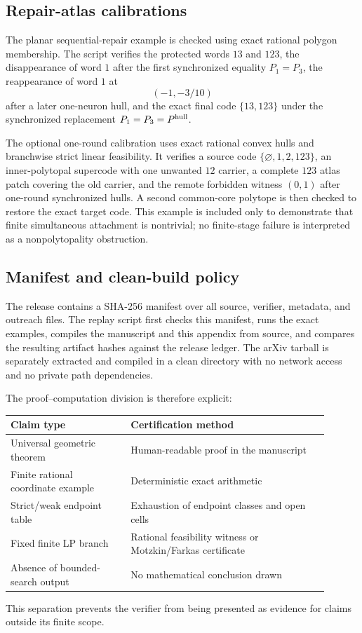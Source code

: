 \subsection{Repair-atlas calibrations}

The planar sequential-repair example is checked using exact rational polygon membership.  The script verifies the protected words $13$ and $123$, the disappearance of word $1$ after the first synchronized equality $P_1=P_3$, the reappearance of word $1$ at
\[
 (-1,-3/10)
\]
after a later one-neuron hull, and the exact final code $\{13,123\}$ under the synchronized replacement $P_1=P_3=P^{\rm hull}$.

The optional one-round calibration uses exact rational convex hulls and branchwise strict linear feasibility.  It verifies a source code $\{\varnothing,1,2,123\}$, an inner-polytopal supercode with one unwanted $12$ carrier, a complete $123$ atlas patch covering the old carrier, and the remote forbidden witness $(0,1)$ after one-round synchronized hulls.  A second common-core polytope is then checked to restore the exact target code.  This example is included only to demonstrate that finite simultaneous attachment is nontrivial; no finite-stage failure is interpreted as a nonpolytopality obstruction.

\subsection{Manifest and clean-build policy}

The release contains a SHA-256 manifest over all source, verifier, metadata, and outreach files.  The replay script first checks this manifest, runs the exact examples, compiles the manuscript and this appendix from source, and compares the resulting artifact hashes against the release ledger.  The arXiv tarball is separately extracted and compiled in a clean directory with no network access and no private path dependencies.

The proof--computation division is therefore explicit:
\begin{center}
\begin{tabular}{p{0.34\linewidth}p{0.56\linewidth}}
\toprule
Claim type & Certification method\\
\midrule
Universal geometric theorem & Human-readable proof in the manuscript\\
Finite rational coordinate example & Deterministic exact arithmetic\\
Strict/weak endpoint table & Exhaustion of endpoint classes and open cells\\
Fixed finite LP branch & Rational feasibility witness or Motzkin/Farkas certificate\\
Absence of bounded-search output & No mathematical conclusion drawn\\
\bottomrule
\end{tabular}
\end{center}

This separation prevents the verifier from being presented as evidence for claims outside its finite scope.
